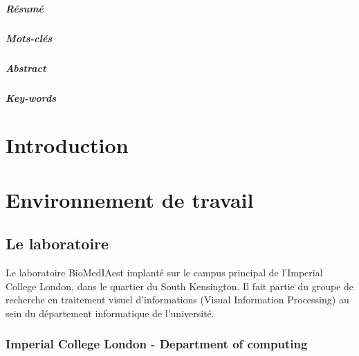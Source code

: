 \documentclass[10pt]{report}
\begin{document}
\paragraph*{Résumé} %
\paragraph*{Mots-clés}
\paragraph*{Abstract}
\paragraph*{Key-words}
\renewcommand\contentsname{Sommaire}
\tableofcontents

\newpage
\chapter*{Introduction}
\chapter{Environnement de travail} 
	\section{Le laboratoire}
		Le laboratoire BioMedIAest implanté sur le campus principal de l'Imperial College London, dans le quartier du South Kensington. Il fait partie du groupe de recherche en traitement visuel d'informations (Visual Information Processing) au sein du département informatique de l'université.
	\subsection{Imperial College London - Department of computing}

	
\end{document}
